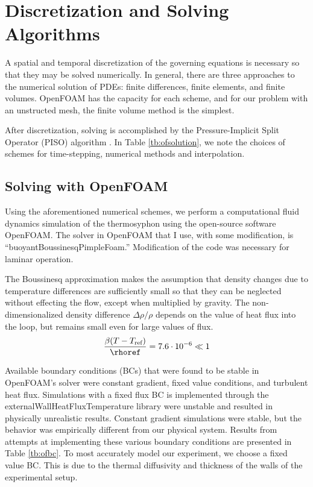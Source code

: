 \section{Discretization and Solving Algorithms}

A spatial and temporal discretization of the governing equations is necessary so that they may be solved numerically.
In general, there are three approaches to the numerical solution of PDEs: finite differences, finite elements, and finite volumes.
OpenFOAM has the capacity for each scheme, and for our problem with an unstructed mesh, the finite volume method is the simplest.

After discretization, solving is accomplished by the Pressure-Implicit Split Operator (PISO) algorithm .
In Table \ref{tb:ofsolution}, we note the choices of schemes for time-stepping, numerical methods and interpolation.

\subsection{Solving with OpenFOAM}

Using the aforementioned numerical schemes, we perform a computational fluid dynamics simulation of the thermosyphon using the open-source software OpenFOAM.
The solver in OpenFOAM that I use, with some modification, is ``buoyantBoussinesqPimpleFoam.''
Modification of the code was necessary for laminar operation.


The Boussinesq approximation makes the assumption that density changes due to temperature differences are sufficiently small so that they can be neglected without effecting the flow, except when multiplied by gravity.
The non-dimensionalized density difference $\Delta \rho / \rho$ depends on the value of heat flux into the loop, but remains small even for large values of flux.
\begin{equation} \frac{\beta(T - T_\text{ref})}{\rhoref} = 7.6 \cdot 10^{-6} \ll 1 \label{eq:bouss} \end{equation}

Available boundary conditions (BCs) that were found to be stable in OpenFOAM's solver were constant gradient, fixed value conditions, and turbulent heat flux.
Simulations with a fixed flux BC is implemented through the externalWallHeatFluxTemperature library were unstable and resulted in physically unrealistic results.
Constant gradient simulations were stable, but the behavior was empirically different from our physical system.
Results from attempts at implementing these various boundary conditions are presented in Table \ref{tb:ofbc}.
To most accurately model our experiment, we choose a fixed value BC.
This is due to the thermal diffusivity and thickness of the walls of the experimental setup.

